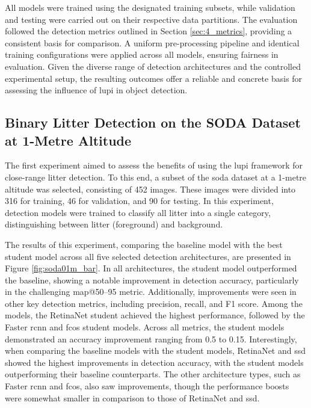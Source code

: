 All models were trained using the designated training subsets, while validation and testing were carried out on their respective data partitions. The evaluation followed the detection metrics outlined in Section \ref{sec:4_metrics}, providing a consistent basis for comparison. A uniform pre-processing pipeline and identical training configurations were applied across all models, ensuring fairness in evaluation. Given the diverse range of detection architectures and the controlled experimental setup, the resulting outcomes offer a reliable and concrete basis for assessing the influence of \gls{lupi} in object detection.


\subsection{Binary Litter Detection on the SODA Dataset at 1-Metre Altitude}
\label{subsec:5_soda01m_dataset_exp}

The first experiment aimed to assess the benefits of using the \gls{lupi} framework for close-range litter detection. To this end, a subset of the \gls{soda} dataset at a 1-metre altitude was selected, consisting of 452 images. These images were divided into 316 for training, 46 for validation, and 90 for testing. In this experiment, detection models were trained to classify all litter into a single category, distinguishing between litter (foreground) and background.

The results of this experiment, comparing the baseline model with the best student model across all five selected detection architectures, are presented in Figure \ref{fig:soda01m_bar}. In all architectures, the student model outperformed the baseline, showing a notable improvement in detection accuracy, particularly in the challenging \gls{map}@50–95 metric. Additionally, improvements were seen in other key detection metrics, including precision, recall, and F1 score. Among the models, the RetinaNet student achieved the highest performance, followed by the Faster \gls{rcnn} and \gls{fcos} student models. Across all metrics, the student models demonstrated an accuracy improvement ranging from 0.5 to 0.15. Interestingly, when comparing the baseline models with the student models, RetinaNet and \gls{ssd} showed the highest improvements in detection accuracy, with the student models outperforming their baseline counterparts. The other architecture types, such as Faster \gls{rcnn} and \gls{fcos}, also saw improvements, though the performance boosts were somewhat smaller in comparison to those of RetinaNet and \gls{ssd}.

